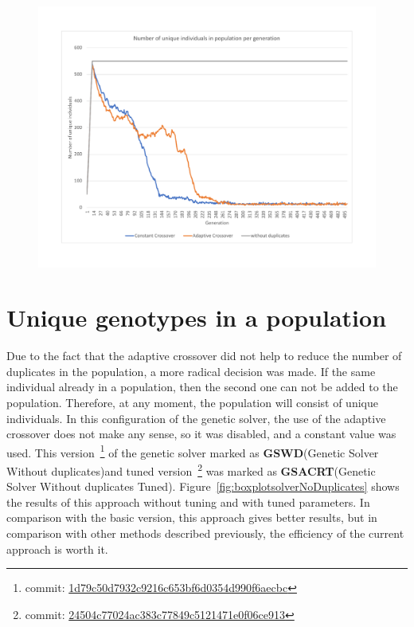 \begin{figure}
	\centering
	\includegraphics[width=\textwidth]{images/UniqIndividualsPerGeneration3.pdf}
	\caption[]{}
	\label{fig:UniqIndividualsPerGeneration3}
\end{figure}                        

\section{Unique genotypes in a population}

Due to the fact that the adaptive crossover did not help to reduce the number of duplicates in the population, a more radical decision was made. If the same individual already in a population, then the second one can not be added to the population. Therefore, at any moment, the population will consist of unique individuals. In this configuration of the genetic solver, the use of the adaptive crossover does not make any sense, so it was disabled, and a constant value was used.
This version~\footnote{commit: \href{https://git-st.inf.tu-dresden.de/mquat/mquat2/commit/1d79c50d7932c9216c653bf6d0354d990f6aecbc}{1d79c50d7932c9216c653bf6d0354d990f6aecbc}} of the genetic solver marked as \textbf{GSWD}(Genetic Solver Without duplicates)and tuned version~\footnote{commit: \href{https://git-st.inf.tu-dresden.de/mquat/mquat2/commit/24504c77024ac383c77849c5121471e0f06ce913}{24504c77024ac383c77849c5121471e0f06ce913}} was marked as \textbf{GSACRT}(Genetic Solver Without duplicates Tuned).
Figure~\ref{fig:boxplotsolverNoDuplicates} shows the results of this approach without tuning and with tuned parameters. In comparison with the basic version, this approach gives better results, but in comparison with other methods described previously, the efficiency of the current approach is worth it.

